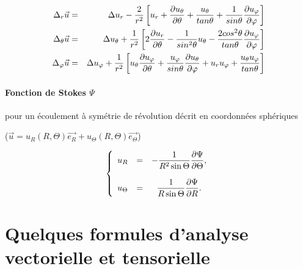 \begin{eqnarray*}
\Delta_r \vec{u}
&=& 
 \Delta u_r 
- \frac{2}{r^2} \left[   u_r +     \frac {\partial  u_\theta} {\partial \theta} 
				+ \frac{u_\theta}{tan \theta}
				+ \frac{1}{sin \theta}  \frac {\partial  u_\varphi} {\partial \varphi} 
				\right] 
\\
\Delta_\theta \vec{u}
&=&
 \Delta u_\theta 
 + \frac{1}{r^2} \left[   2  \frac {\partial  u_r} {\partial \theta}
				- \frac{1}{sin^2  \theta} u_\theta
				 - \frac{2 cos^2 \theta}{tan \theta} \frac {\partial u_\varphi} {\partial \varphi}
				\right]
\\
\Delta_\varphi \vec{u} 
&=&
\Delta u_\varphi  
+ \frac{1}{r^2} \left[        u_\theta \frac {\partial u_\varphi} {\partial \theta} 
				+ \frac{u_\varphi}{sin \theta}\frac {\partial u_\theta} {\partial \varphi} 
				+ u_r u_\varphi   + \frac{u_\theta u_\varphi }{tan \theta} 
				\right]
\end{eqnarray*}



\paragraph{Fonction de Stokes $\Psi$}  pour un écoulement à symétrie de révolution décrit en coordonnées sphériques

($\vec{u} = u_R(R,\Theta) \vec{e_R} + u_\Theta(R,\Theta) \vec{e_\Theta}$)


\begin{equation}
\left\{
\begin{array}{ccc}
\displaystyle u_R &=& \displaystyle - \frac{1}{R^2 \sin \Theta }\frac {\partial \Psi} {\partial \Theta}, \\ \\
\displaystyle u_\Theta &=& \displaystyle  \frac{1}{R \sin \Theta}\frac {\partial \Psi} {\partial R}.
\end{array}
\right.
\end{equation}




\clearpage


\section{Quelques formules d'analyse vectorielle et tensorielle}



